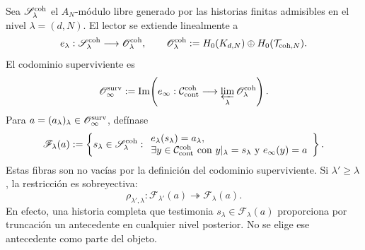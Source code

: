 Sea \(\mathscr S_\lambda^{\rm coh}\) el \(A_N\)-módulo libre generado por las
historias finitas admisibles en el nivel \(\lambda=(d,N)\). El lector se
extiende linealmente a
\begin{equation}\label{eq:pdfv2-coh-e-lambda}
 e_\lambda:\mathscr S_\lambda^{\rm coh}
 \longrightarrow\mathscr O_\lambda^{\rm coh},
 \qquad
 \mathscr O_\lambda^{\rm coh}
 :=H_0(K_{d,N})\oplus H_0(\mathcal T_{{\rm coh},N}).
\end{equation}
El codominio superviviente es
\begin{equation}\label{eq:pdfv2-coh-surviving-output}
 \mathscr O_\infty^{\rm surv}
 :=\operatorname{Im}\!\left(
 e_\infty:\mathcal C_{\rm cont}^{\rm coh}
 \longrightarrow\varprojlim_\lambda\mathscr O_\lambda^{\rm coh}
 \right).
\end{equation}
Para \(a=(a_\lambda)_\lambda\in\mathscr O_\infty^{\rm surv}\), defínase
\begin{equation}\label{eq:pdfv2-coh-fiber}
 \mathscr F_\lambda(a):=
 \left\{s_\lambda\in\mathscr S_\lambda^{\rm coh}:
 \begin{array}{l}
 e_\lambda(s_\lambda)=a_\lambda,\\
 \exists y\in\mathcal C_{\rm cont}^{\rm coh}\text{ con }
 y|_\lambda=s_\lambda\text{ y }e_\infty(y)=a
 \end{array}
 \right\}.
\end{equation}
Estas fibras son no vacías por la definición del codominio superviviente. Si
\(\lambda'\geq\lambda\), la restricción es sobreyectiva:
\begin{equation}\label{eq:pdfv2-coh-fiber-surjection}
 \rho_{\lambda',\lambda}:\mathscr F_{\lambda'}(a)
 \twoheadrightarrow\mathscr F_\lambda(a).
\end{equation}
En efecto, una historia completa que testimonia
\(s_\lambda\in\mathscr F_\lambda(a)\) proporciona por truncación un
antecedente en cualquier nivel posterior. No se elige ese antecedente como
parte del objeto.

